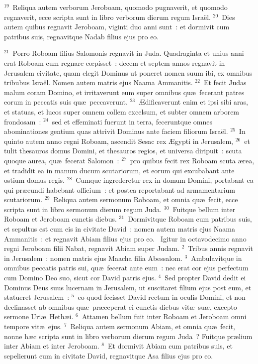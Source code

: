 ${}^{19}$~Reliqua autem verborum Jeroboam, quomodo pugnaverit, et quomodo regnaverit, ecce scripta sunt in libro verborum dierum regum Isra\"el.
${}^{20}$~Dies autem quibus regnavit Jeroboam, viginti duo anni sunt~: et dormivit cum patribus suis, regnavitque Nadab filius ejus pro eo.


${}^{21}$~Porro Roboam filius Salomonis regnavit in Juda. Quadraginta et unius anni erat Roboam cum regnare cœpisset~: decem et septem annos regnavit in Jerusalem civitate, quam elegit Dominus ut poneret nomen suum ibi, ex omnibus tribubus Isra\"el. Nomen autem matris ejus Naama Ammanitis.
${}^{22}$~Et fecit Judas malum coram Domino, et irritaverunt eum super omnibus qu\ae\ fecerant patres eorum in peccatis suis qu\ae\ peccaverunt.
${}^{23}$~\AE dificaverunt enim et ipsi sibi aras, et statuas, et lucos super omnem collem excelsum, et subter omnem arborem frondosam~:
${}^{24}$~sed et effeminati fuerunt in terra, feceruntque omnes abominationes gentium quas attrivit Dominus ante faciem filiorum Isra\"el.
${}^{25}$~In quinto autem anno regni Roboam, ascendit Sesac rex \AE gypti in Jerusalem,
${}^{26}$~et tulit thesauros domus Domini, et thesauros regios, et universa diripuit~: scuta quoque aurea, qu\ae\ fecerat Salomon~:
${}^{27}$~pro quibus fecit rex Roboam scuta \ae rea, et tradidit ea in manum ducum scutariorum, et eorum qui excubabant ante ostium domus regis.
${}^{28}$~Cumque ingrederetur rex in domum Domini, portabant ea qui pr\ae eundi habebant officium~: et postea reportabant ad armamentarium scutariorum.
${}^{29}$~Reliqua autem sermonum Roboam, et omnia qu\ae\ fecit, ecce scripta sunt in libro sermonum dierum regum Juda.
${}^{30}$~Fuitque bellum inter Roboam et Jeroboam cunctis diebus.
${}^{31}$~Dormivitque Roboam cum patribus suis, et sepultus est cum eis in civitate David~: nomen autem matris ejus Naama Ammanitis~: et regnavit Abiam filius ejus pro eo.
~Igitur in octavodecimo anno regni Jeroboam filii Nabat, regnavit Abiam super Judam.
${}^{2}$~Tribus annis regnavit in Jerusalem~: nomen matris ejus Maacha filia Abessalom.
${}^{3}$~Ambulavitque in omnibus peccatis patris sui, qu\ae\ fecerat ante eum~: nec erat cor ejus perfectum cum Domino Deo suo, sicut cor David patris ejus.
${}^{4}$~Sed propter David dedit ei Dominus Deus suus lucernam in Jerusalem, ut suscitaret filium ejus post eum, et statueret Jerusalem~:
${}^{5}$~eo quod fecisset David rectum in oculis Domini, et non declinasset ab omnibus qu\ae\ pr\ae ceperat ei cunctis diebus vit\ae\ su\ae , excepto sermone Uri\ae\ Heth\ae i.
${}^{6}$~Attamen bellum fuit inter Roboam et Jeroboam omni tempore vit\ae\ ejus.
${}^{7}$~Reliqua autem sermonum Abiam, et omnia qu\ae\ fecit, nonne h\ae c scripta sunt in libro verborum dierum regum Juda~? Fuitque pr\ae lium inter Abiam et inter Jeroboam.
${}^{8}$~Et dormivit Abiam cum patribus suis, et sepelierunt eum in civitate David, regnavitque Asa filius ejus pro eo.


